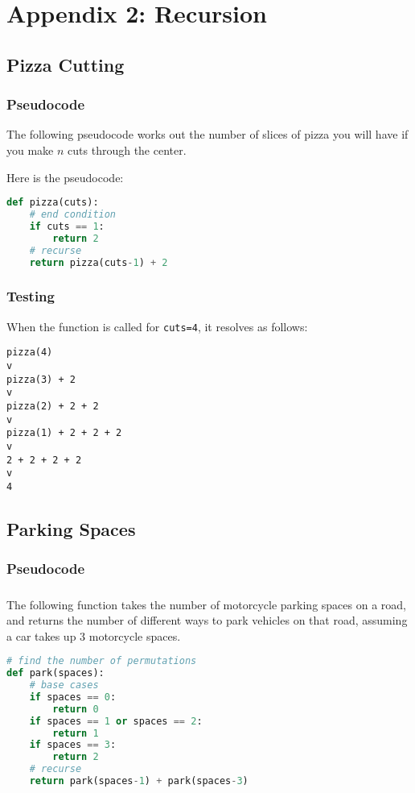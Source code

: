 \documentclass{report}
\begin{document}
\chapter*{Appendix 2: Recursion}
\section*{Pizza Cutting}
\subsection*{Pseudocode}
The following pseudocode works out the number of slices of pizza you will have if you make $n$ cuts through the center.

Here is the pseudocode:
\begin{lstlisting}[language=Python]
def pizza(cuts):
    # end condition
    if cuts == 1:
        return 2
    # recurse
    return pizza(cuts-1) + 2
\end{lstlisting}
\subsection*{Testing}
When the function is called for \texttt{cuts=4}, it resolves as follows:
\begin{lstlisting}
pizza(4)
v
pizza(3) + 2
v
pizza(2) + 2 + 2
v
pizza(1) + 2 + 2 + 2
v
2 + 2 + 2 + 2
v
4
\end{lstlisting}

\section*{Parking Spaces}
\subsection*{Pseudocode}
\paragraph{}
The following function takes the number of motorcycle parking spaces on a road, and returns the number of different ways to park vehicles on that road, assuming a car takes up 3 motorcycle spaces.

\begin{lstlisting}[language=Python]
# find the number of permutations
def park(spaces):
    # base cases
    if spaces == 0:
        return 0
    if spaces == 1 or spaces == 2:
        return 1
    if spaces == 3:
        return 2
    # recurse
    return park(spaces-1) + park(spaces-3)
\end{lstlisting}
\end{document}
